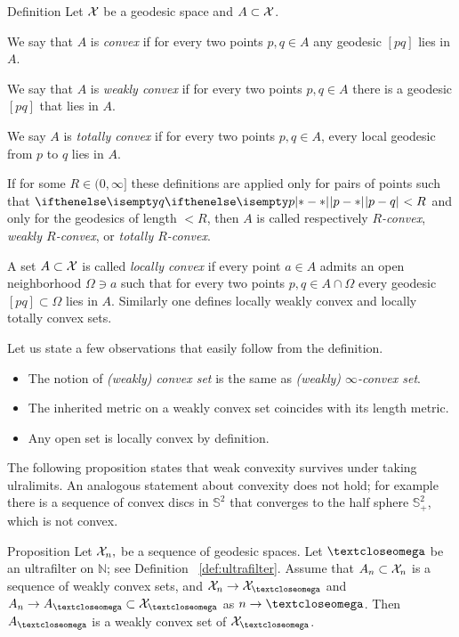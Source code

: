\begin{thm}{Definition} 
\label{def:convex-set}
Let $\mathcal{X}$ be a geodesic space and $A\subset\spc{X}$.

We say that $A$ is 
\emph{convex}
if for every two points $p,q\in A$ any geodesic $[pq]$ lies in $A$.

We say that $A$ is 
\emph{weakly convex}
if for every two points $p,q\in A$
there is a geodesic $[pq]$ 
that lies in $A$.

We say  $A$ is 
\emph{totally convex}
if for every two points $p,q\in A$, every local geodesic from $p$ to $q$ lies in $A$.

If for some $R\in (0,\infty]$ these definitions are applied only for pairs of points such that $\dist{p}{q}{}<R$ and only for the geodesics of length $<R$,
then $A$ is called respectively 
\emph{$R$-convex},
\emph{weakly $R$-convex},
or \emph{totally  $R$-convex}.

A set $A\subset\spc{X}$ is called 
\emph{locally convex}
if every point $a\in A$ admits an open neighborhood $\Omega\ni a$
such that for every two points $p,q\in A\cap\Omega$ every geodesic $[pq]\subset \Omega$ lies in $A$.
Similarly one defines locally weakly convex and locally totally convex sets. %
\end{thm}

 Let us state a few observations that easily follow  from the definition.
\begin{itemize}
\item The notion of \emph{(weakly) convex set} is the same as {}\emph{(weakly) $\infty$-convex set}.
\item The inherited metric on a weakly convex set coincides with its length metric.
\item Any open set is locally convex by definition.
\end{itemize}

The following proposition states that weak convexity survives under taking ulralimits.
An analogous statement about convexity does not hold;
for example there is a sequence of convex discs in $\mathbb{S}^2$ that converges to the half sphere $\mathbb{S}^2_+$, which is not convex.

\begin{thm}{Proposition}\label{prop:weak-convex-stable}
Let $\mathcal{X}_n,$ be a sequence of geodesic spaces.
Let $\o$ be an ultrafilter on $\mathbb N$; see Definition ~\ref{def:ultrafilter}.
Assume that  $A_n\subset \spc{X}_n$ is a sequence of weakly convex sets, and 
$\spc{X}_n\to \spc{X}_\o$ and $A_n\to A_\o\subset \spc{X}_\o$ as $n\to\o$.
Then $A_\o$ is a weakly convex set of $\spc{X}_\o$.
\end{thm}

